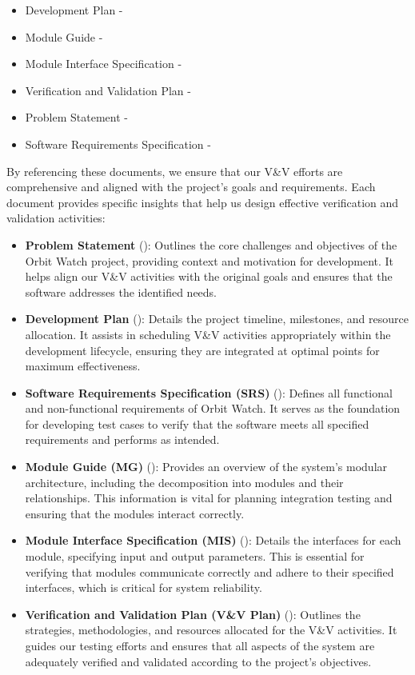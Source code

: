 \documentclass[12pt, titlepage]{article}
\begin{document}
\begin{itemize}
    \item Development Plan - \cite{Development_Plan}
    \item Module Guide - \cite{MG}
    \item Module Interface Specification - \cite{MIS}
    \item Verification and Validation Plan - \cite{VnV}
    \item Problem Statement - \cite{Problem_Statement}
    \item Software Requirements Specification - \cite{SRS}
\end{itemize}

By referencing these documents, we ensure that our V\&V efforts are comprehensive and aligned with the project's goals and requirements. Each document provides specific insights that help us design effective verification and validation activities:

\begin{itemize}
    \item \textbf{Problem Statement} (\cite{Problem_Statement}): Outlines the core challenges and objectives of the Orbit Watch project, providing context and motivation for development. It helps align our V\&V activities with the original goals and ensures that the software addresses the identified needs.

    \item \textbf{Development Plan} (\cite{Development_Plan}): Details the project timeline, milestones, and resource allocation. It assists in scheduling V\&V activities appropriately within the development lifecycle, ensuring they are integrated at optimal points for maximum effectiveness.

    \item \textbf{Software Requirements Specification (SRS)} (\cite{SRS}): Defines all functional and non-functional requirements of Orbit Watch. It serves as the foundation for developing test cases to verify that the software meets all specified requirements and performs as intended.

    \item \textbf{Module Guide (MG)} (\cite{MG}): Provides an overview of the system's modular architecture, including the decomposition into modules and their relationships. This information is vital for planning integration testing and ensuring that the modules interact correctly.

    \item \textbf{Module Interface Specification (MIS)} (\cite{MIS}): Details the interfaces for each module, specifying input and output parameters. This is essential for verifying that modules communicate correctly and adhere to their specified interfaces, which is critical for system reliability.

    \item \textbf{Verification and Validation Plan (V\&V Plan)} (\cite{VnV}): Outlines the strategies, methodologies, and resources allocated for the V\&V activities. It guides our testing efforts and ensures that all aspects of the system are adequately verified and validated according to the project's objectives.
\end{itemize}
\end{document}
